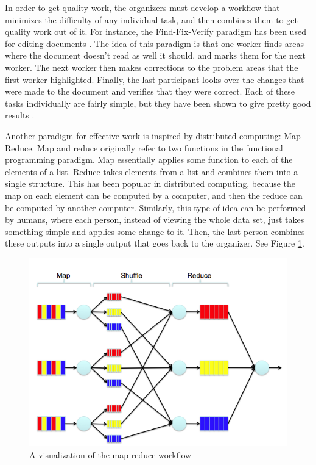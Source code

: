 In order to get quality work, the organizers must develop a workflow that minimizes the difficulty of any individual task, and then combines them to get quality work out of it. For instance, the Find-Fix-Verify paradigm has been used for editing documents \cite{crowdsourcing}. The idea of this paradigm is that one worker finds areas where the document doesn't read as well it should, and marks them for the next worker. The next worker then makes corrections to the problem areas that the first worker highlighted. Finally, the last participant looks over the changes that were made to the document and verifies that they were correct. Each of these tasks individually are fairly simple, but they have been shown to give pretty good results \cite{crowdsourcing}. 

Another paradigm for effective work is inspired by distributed computing: Map Reduce. Map and reduce originally refer to two functions in the functional programming paradigm. Map essentially applies some function to each of the elements of a list. Reduce takes elements from a list and combines them into a single structure. This has been popular in distributed computing, because the map on each element can be computed by a computer, and then the reduce can be computed by another computer. Similarly, this type of idea can be performed by humans, where each person, instead of viewing the whole data set, just takes something simple and applies some change to it. Then, the last person combines these outputs into a single output that goes back to the organizer. See Figure \ref{fig:mapreduce}.

\begin{figure}[!h]
\centering
\includegraphics[width=0.9\columnwidth]{figure/mapreduce}
\caption{A visualization of the map reduce workflow}
\label{fig:mapreduce}
\end{figure} 

